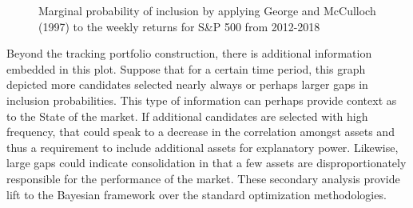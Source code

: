 \documentclass[a4paper, 12pt]{article}
\theoremstyle{plain}
\theoremstyle{definition}
\theoremstyle{remark}
\begin{document}
\begin{figure}[H]
\hfill
{}
\caption{Marginal probability of inclusion by applying George and McCulloch (1997) to the weekly returns for S\&P 500 from 2012-2018 }
\end{figure}

Beyond the tracking portfolio construction, there is additional information embedded in this plot. Suppose that for a certain time period, this graph depicted more candidates selected nearly always or perhaps larger gaps in inclusion probabilities. This type of information can perhaps provide context as to the State of the market. If additional candidates are selected with high frequency, that could speak to a decrease in the correlation amongst assets and thus a requirement to include additional assets for explanatory power. Likewise, large gaps could indicate consolidation in that a few assets are disproportionately responsible for the performance of the market. These secondary analysis provide lift to the Bayesian framework over the standard optimization methodologies.
\end{document}
